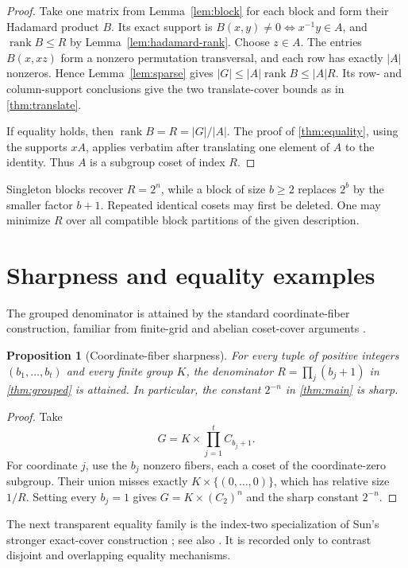 \documentclass[11pt,a4paper]{amsart}
\newtheorem{proposition}[theorem]{Proposition}
\theoremstyle{definition}
\theoremstyle{remark}
\newcommand{\rank}{\operatorname{rank}}
\begin{document}
\begin{proof}
Take one matrix from Lemma~\ref{lem:block} for each block and form their Hadamard
product $B$.  Its exact support is
$B(x,y)\ne0\Longleftrightarrow x^{-1}y\in A$, and
$\rank B\le R$ by Lemma~\ref{lem:hadamard-rank}.  Choose $z\in A$.  The entries
$B(x,xz)$ form a nonzero permutation transversal, and each row has exactly
$|A|$ nonzeros.  Hence Lemma~\ref{lem:sparse} gives
$|G|\le |A|\rank B\le |A|R$.  Its row- and column-support conclusions give
the two translate-cover bounds as in \cref{thm:translate}.

If equality holds, then $\rank B=R=|G|/|A|$.  The proof of
\cref{thm:equality}, using the supports $xA$, applies verbatim after translating
one element of $A$ to the identity.  Thus $A$ is a subgroup coset of index $R$.
\end{proof}

Singleton blocks recover $R=2^n$, while a block of size $b\ge2$ replaces
$2^b$ by the smaller factor $b+1$.  Repeated identical cosets may first be
deleted.  One may minimize $R$ over all compatible block partitions of the
given description.

\section{Sharpness and equality examples}

The grouped denominator is attained by the standard coordinate-fiber
construction, familiar from finite-grid and abelian coset-cover arguments
\cite{AlonFuredi1993,Szegedy2007,LettlSun2008,SambaleTarnauceanu2022}.

\begin{proposition}[Coordinate-fiber sharpness]\label{prop:sharp}
For every tuple of positive integers $(b_1,\ldots,b_t)$ and every finite group
$K$, the denominator $R=\prod_j(b_j+1)$ in \cref{thm:grouped} is attained.
In particular, the constant $2^{-n}$ in \cref{thm:main} is sharp.
\end{proposition}

\begin{proof}
Take
\[
  G=K\times\prod_{j=1}^t C_{b_j+1}.
\]
For coordinate $j$, use the $b_j$ nonzero fibers, each a coset of the
coordinate-zero subgroup.  Their union misses exactly
$K\times\{(0,\ldots,0)\}$, which has relative size $1/R$.  Setting every
$b_j=1$ gives $G=K\times(C_2)^n$ and the sharp constant $2^{-n}$.
\end{proof}

The next transparent equality family is the index-two specialization of Sun's
stronger exact-cover construction \cite[Example~1.2, p.~417]{Sun2001}; see also \cite{Sun2006}.  It is
recorded only to contrast disjoint and overlapping equality mechanisms.
\end{document}

